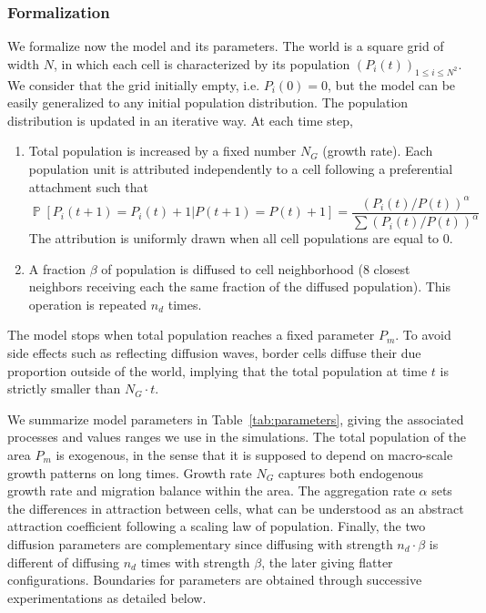 \documentclass[10pt,letterpaper]{article}
\DeclareMathOperator{\Proba}{\mathbb{P}}
\newcommand{\Pb}[1]{\ensuremath{\Proba\!\left[#1\right]}}
\begin{document}
\subsubsection*{Formalization}

We formalize now the model and its parameters. The world is a square grid of width $N$, in which each cell is characterized by its population $(P_i(t))_{1\leq i\leq N^2}$. We consider that the grid initially empty, i.e. $P_i(0)=0$, but the model can be easily generalized to any initial population distribution. The population distribution is updated in an iterative way. At each time step,

\begin{enumerate}
\item Total population is increased by a fixed number $N_G$ (growth rate). Each population unit is attributed independently to a cell following a preferential attachment such that 
\begin{equation}
\Pb{P_i(t+1)=P_i(t)+1|P(t+1)=P(t)+1}=\frac{(P_i(t)/P(t))^{\alpha}}{\sum(P_i(t)/P(t))^{\alpha}}
\end{equation}
The attribution is uniformly drawn when all cell populations are equal to 0.
\item A fraction $\beta$ of population is diffused to cell neighborhood (8 closest neighbors receiving each the same fraction of the diffused population). This operation is repeated $n_d$ times.
\end{enumerate}

The model stops when total population reaches a fixed parameter $P_m$. To avoid side effects such as reflecting diffusion waves, border cells diffuse their due proportion outside of the world, implying that the total population at time $t$ is strictly smaller than $N_G\cdot t$.

We summarize model parameters in Table~\ref{tab:parameters}, giving the associated processes and values ranges we use in the simulations. The total population of the area $P_m$ is exogenous, in the sense that it is supposed to depend on macro-scale growth patterns on long times. Growth rate $N_G$ captures both endogenous growth rate and migration balance within the area. The aggregation rate $\alpha$ sets the differences in attraction between cells, what can be understood as an abstract attraction coefficient following a scaling law of population. Finally, the two diffusion parameters are complementary since diffusing with strength $n_d\cdot \beta$ is different of diffusing $n_d$ times with strength $\beta$, the later giving flatter configurations. Boundaries for parameters are obtained through successive experimentations as detailed below.
\end{document}
